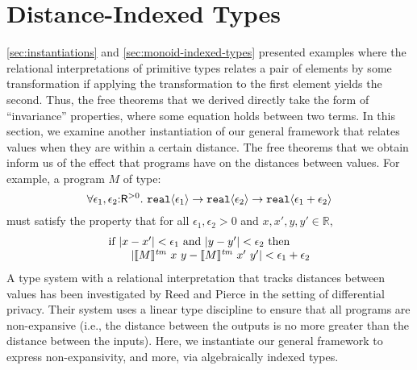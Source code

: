 \section{Distance-Indexed Types}
\label{sec:metric-types}

\newcommand{\Metric}{\mathit{Met}}
\newcommand{\metricSort}{\mathsf{R}^{>0}}

\autoref{sec:instantiations} and \autoref{sec:monoid-indexed-types}
presented examples where the relational interpretations of primitive
types relates a pair of elements by some transformation if applying
the transformation to the first element yields the second. Thus, the
free theorems that we derived directly take the form of ``invariance''
properties, where some equation holds between two terms. In this
section, we examine another instantiation of our general framework
that relates values when they are within a certain distance. The free
theorems that we obtain inform us of the effect that programs have on
the distances between values. For example, a program $M$ of type:
\begin{displaymath}
  \forall \epsilon_1,\epsilon_2\mathord:\metricSort.\ \tyPrim{real}{\epsilon_1} \to \tyPrim{real}{\epsilon_2} \to \tyPrim{real}{\epsilon_1 + \epsilon_2}
\end{displaymath}
must satisfy the property that for all $\epsilon_1, \epsilon_2 > 0$
and $x, x', y, y' \in \mathbb{R}$,
\begin{displaymath} %
  \begin{array}{l}
    \textrm{if }|x - x'| < \epsilon_1 \textrm{ and } |y - y'| < \epsilon_2 \textrm{ then}\\
    \hspace{2em}|\tmSem{M}\ x\ y - \tmSem{M}\ x'\ y'| < \epsilon_1 + \epsilon_2
  \end{array}
\end{displaymath}
A type system with a relational interpretation that tracks distances
between values has %
been investigated by Reed and Pierce
\cite{reed10distance} in the setting of differential privacy. Their
system uses a linear type discipline to ensure that all programs are
non-expansive (i.e., the distance between the outputs is no more greater
than the distance between the inputs). Here, we instantiate our general
framework %
to express
non-expansivity, and more, via algebraically indexed types.

